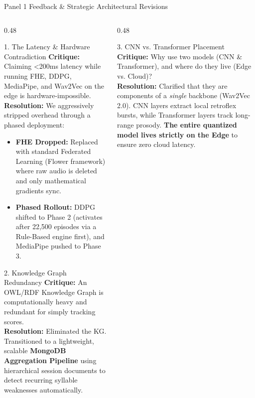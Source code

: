 \documentclass[aspectratio=169, 11pt, xcolor=table]{beamer}
\begin{document}
\begin{frame}{Panel 1 Feedback \& Strategic Architectural Revisions}
    \vspace{-4mm}
    \begin{columns}[T, totalwidth=\textwidth]

        \begin{column}{0.48\textwidth}
            \begin{block}{1. The Latency \& Hardware Contradiction}
                \tiny
                \textbf{Critique:} Claiming <200ms latency while running FHE, DDPG, MediaPipe, and Wav2Vec on the edge is hardware-impossible.\\
                \textbf{Resolution:} We aggressively stripped overhead through a phased deployment:
                \begin{itemize}
                    \item \textbf{FHE Dropped:} Replaced with standard Federated Learning (Flower framework) where raw audio is deleted and only mathematical gradients sync.
                    \item \textbf{Phased Rollout:} DDPG shifted to Phase 2 (activates after 22,500 episodes via a Rule-Based engine first), and MediaPipe pushed to Phase 3.
                \end{itemize}
            \end{block}

            \vspace{0.5mm}
            \begin{block}{2. Knowledge Graph Redundancy}
                \tiny
                \textbf{Critique:} An OWL/RDF Knowledge Graph is computationally heavy and redundant for simply tracking scores.\\
                \textbf{Resolution:} Eliminated the KG. Transitioned to a lightweight, scalable \textbf{MongoDB Aggregation Pipeline} using hierarchical session documents to detect recurring syllable weaknesses automatically.
            \end{block}
        \end{column}

        \begin{column}{0.48\textwidth}
            \begin{block}{3. CNN vs. Transformer Placement}
                \tiny
                \textbf{Critique:} Why use two models (CNN \& Transformer), and where do they live (Edge vs. Cloud)?\\
                \textbf{Resolution:} Clarified that they are components of a \textit{single} backbone (Wav2Vec 2.0). CNN layers extract local retroflex bursts, while Transformer layers track long-range prosody. \textbf{The entire quantized model lives strictly on the Edge} to ensure zero cloud latency.
            \end{block}


\end{column}
\end{columns}
\end{frame}
\end{document}
